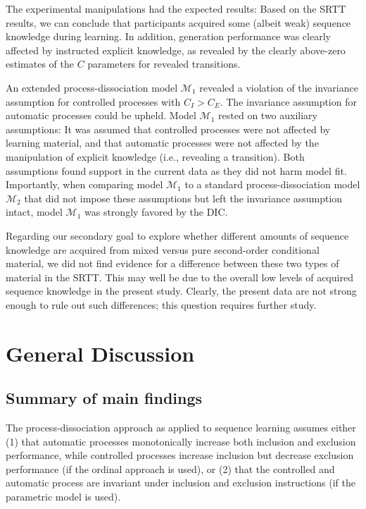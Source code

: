 \documentclass[man]{apa6}
\theoremstyle{definition}
\theoremstyle{definition}
\theoremstyle{definition}
\theoremstyle{remark}
\begin{document}
The experimental manipulations had the expected results: Based on the
SRTT results, we can conclude that participants acquired some (albeit
weak) sequence knowledge during learning. In addition, generation
performance was clearly affected by instructed explicit knowledge, as
revealed by the clearly above-zero estimates of the \(C\) parameters for
revealed transitions.

An extended process-dissociation model \(\mathcal{M}_1\) revealed a
violation of the invariance assumption for controlled processes with
\(C_I > C_E\). The invariance assumption for automatic processes could
be upheld. Model \(\mathcal{M}_1\) rested on two auxiliary assumptions:
It was assumed that controlled processes were not affected by learning
material, and that automatic processes were not affected by the
manipulation of explicit knowledge (i.e., revealing a transition). Both
assumptions found support in the current data as they did not harm model
fit. Importantly, when comparing model \(\mathcal{M}_1\) to a standard
process-dissociation model \(\mathcal{M}_2\) that did not impose these
assumptions but left the invariance assumption intact, model
\(\mathcal{M}_1\) was strongly favored by the DIC.

Regarding our secondary goal to explore whether different amounts of
sequence knowledge are acquired from mixed versus pure second-order
conditional material, we did not find evidence for a difference between
these two types of material in the SRTT. This may well be due to the
overall low levels of acquired sequence knowledge in the present study.
Clearly, the present data are not strong enough to rule out such
differences; this question requires further study.

\section{General Discussion}\label{general-discussion}

\subsection{Summary of main findings}\label{summary-of-main-findings}

The process-dissociation approach as applied to sequence learning
assumes either (1) that automatic processes monotonically increase both
inclusion and exclusion performance, while controlled processes increase
inclusion but decrease exclusion performance (if the ordinal approach is
used), or (2) that the controlled and automatic process are invariant
under inclusion and exclusion instructions (if the parametric model is
used).
\end{document}
